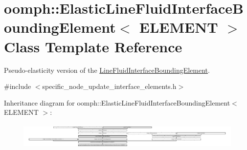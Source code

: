 \hypertarget{classoomph_1_1ElasticLineFluidInterfaceBoundingElement}{}\section{oomph\+:\+:Elastic\+Line\+Fluid\+Interface\+Bounding\+Element$<$ E\+L\+E\+M\+E\+NT $>$ Class Template Reference}
\label{classoomph_1_1ElasticLineFluidInterfaceBoundingElement}


Pseudo-\/elasticity version of the \hyperlink{classoomph_1_1LineFluidInterfaceBoundingElement}{Line\+Fluid\+Interface\+Bounding\+Element}.  




{\ttfamily \#include $<$specific\+\_\+node\+\_\+update\+\_\+interface\+\_\+elements.\+h$>$}

Inheritance diagram for oomph\+:\+:Elastic\+Line\+Fluid\+Interface\+Bounding\+Element$<$ E\+L\+E\+M\+E\+NT $>$\+:\begin{figure}[H]
\begin{center}
\leavevmode
\includegraphics[height=1.322537cm]{classoomph_1_1ElasticLineFluidInterfaceBoundingElement}
\end{center}
\end{figure}
